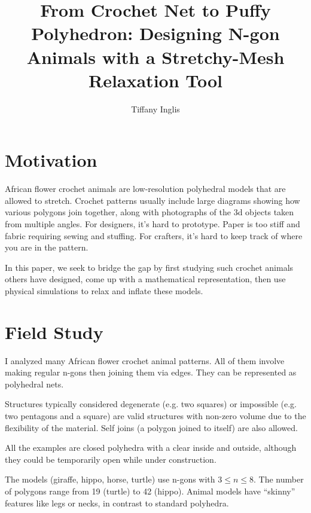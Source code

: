 \documentclass[letterpaper,11pt]{article}
\title{From Crochet Net to Puffy Polyhedron: Designing N-gon Animals with a Stretchy-Mesh Relaxation Tool}
\author{Tiffany Inglis}
\date{}
\begin{document}
\maketitle
\thispagestyle{empty}

\begin{abstract}
\end{abstract}

\section*{Motivation}

African flower crochet animals are low-resolution polyhedral models that are allowed to stretch. Crochet patterns usually include large diagrams showing how various polygons join together, along with photographs of the 3d objects taken from multiple angles. For designers, it's hard to prototype. Paper is too stiff and fabric requiring sewing and stuffing. For crafters, it's hard to keep track of where you are in the pattern.

In this paper, we seek to bridge the gap by first studying such crochet animals others have designed, come up with a mathematical representation, then use physical simulations to relax and inflate these models.

\section*{Field Study}

I analyzed many African flower crochet animal patterns. All of them involve making regular n-gons then joining them via edges. They can be represented as polyhedral nets.

Structures typically considered degenerate (e.g. two squares) or impossible (e.g. two pentagons and a square) are valid structures with non-zero volume due to the flexibility of the material. Self joins (a polygon joined to itself) are also allowed.

All the examples are closed polyhedra with a clear inside and outside, although they could be temporarily open while under construction.

The models (giraffe, hippo, horse, turtle) use n-gons with $3 \leq n \leq 8$. The number of polygons range from 19 (turtle) to 42 (hippo). Animal models have ``skinny'' features like legs or necks, in contrast to standard polyhedra.
\end{document}
